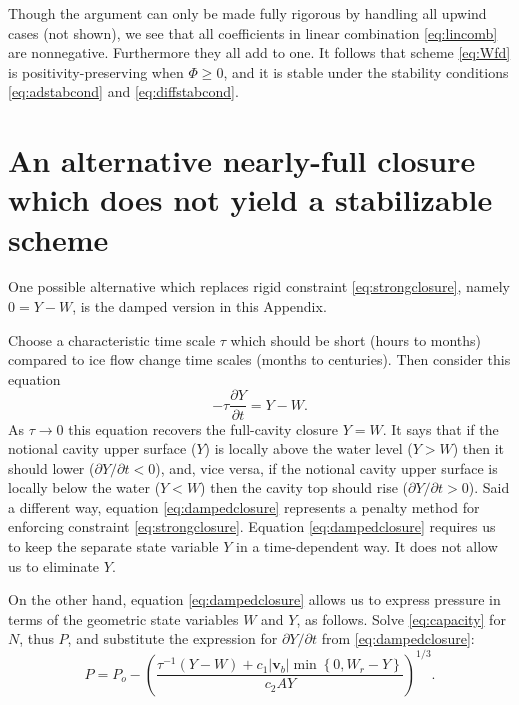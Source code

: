 \documentclass[12pt,final]{amsart}%
\newcommand\bv{\mathbf{v}}
\begin{document}
Though the argument can only be made fully rigorous by handling all upwind cases (not shown), we see that all coefficients in linear combination \eqref{eq:lincomb} are nonnegative.  Furthermore they all add to one.  It follows \citep{MortonMayers} that scheme \eqref{eq:Wfd} is positivity-preserving when $\Phi\ge 0$, and it is stable under the stability conditions \eqref{eq:adstabcond} and \eqref{eq:diffstabcond}.


\section{An alternative nearly-full closure which does not yield a stabilizable scheme}

One possible alternative which replaces rigid constraint \eqref{eq:strongclosure}, namely $0 = Y - W$, is the damped version in this Appendix.

Choose a characteristic time scale $\tau$ which should be short (hours to months) compared to ice flow change time scales (months to centuries).  Then consider this equation
\begin{equation}
- \tau \frac{\partial Y}{\partial t} = Y - W. \label{eq:dampedclosure}
\end{equation}
As $\tau \to 0$ this equation recovers the full-cavity closure $Y=W$.  It says that if the notional cavity upper surface ($Y$) is locally above the water level ($Y>W$) then it should lower ($\partial Y/\partial t < 0$), and, vice versa, if the notional cavity upper surface is locally below the water ($Y<W$) then the cavity top should rise ($\partial Y/\partial t > 0$).   Said a different way, equation \eqref{eq:dampedclosure} represents a penalty method for enforcing constraint \eqref{eq:strongclosure}.  Equation \eqref{eq:dampedclosure} requires us to keep the separate state variable $Y$ in a time-dependent way.  It does not allow us to eliminate $Y$.

On the other hand, equation \eqref{eq:dampedclosure} allows us to express pressure in terms of the geometric state variables $W$ and $Y$, as follows.  Solve \eqref{eq:capacity} for $N$, thus $P$, and substitute the expression for $\partial Y/\partial t$ from \eqref{eq:dampedclosure}:
\begin{equation}
P = P_o - \left(\frac{\tau^{-1} (Y-W) + c_1 |\bv_b| \min\left\{0,W_r - Y\right\}}{c_2 A Y}\right)^{1/3}.  \label{eq:pressurenormal}
\end{equation}
\end{document}
